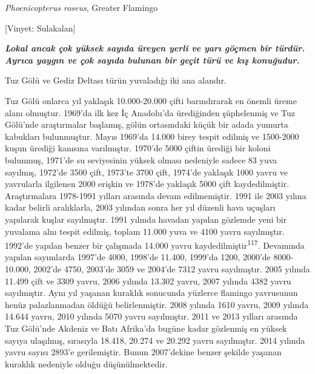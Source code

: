 \documentclass[
  letterpaper,
  DIV=11,
  numbers=noendperiod]{scrreprt}
\begin{document}
\emph{Phoenicopterus roseus}, Greater Flamingo

{[}Vinyet: Sulakalan{]}

\textbf{\emph{Lokal ancak çok yüksek sayıda üreyen yerli ve yarı göçmen
bir türdür. Ayrıca yaygın ve çok sayıda bulunan bir geçit türü ve kış
konuğudur.}}

Tuz Gölü ve Gediz Deltası türün yuvaladığı iki ana alandır.

Tuz Gölü onlarca yıl yaklaşık 10.000-20.000 çifti barındırarak en önemli
üreme alanı olmuştur. 1969'da ilk kez İç Anadolu'da ürediğinden
şüphelenmiş ve Tuz Gölü'nde araştırmalar başlamış, gölün ortasındaki
küçük bir adada yumurta kabukları bulunmuştur. Mayıs 1969'da 14.000
birey tespit edilmiş ve 1500-2000 kuşun ürediği kanısına varılmıştır.
1970'de 5000 çiftin ürediği bir koloni bulunmuş, 1971'de su seviyesinin
yüksek olması nedeniyle sadece 83 yuva sayılmış, 1972'de 3500 çift,
1973'te 3700 çift, 1974'de yaklaşık 1000 yavru ve yavrularla ilgilenen
2000 erişkin ve 1978'de yaklaşık 5000 çift kaydedilmiştir. Araştırmalara
1978-1991 yılları arasında devam edilmemiştir. 1991 ile 2003 yılına
kadar belirli aralıklarla, 2003 yılından sonra her yıl düzenli hava
uçuşları yapılarak kuşlar sayılmıştır. 1991 yılında havadan yapılan
gözlemde yeni bir yuvalama alnı tespit edilmiş, toplam 11.000 yuva ve
4100 yavru sayılmıştır. 1992'de yapılan benzer bir çalışmada 14.000
yavru kaydedilmiştir\textsuperscript{117}. Devamında yapılan sayımlarda
1997'de 4000, 1998'de 11.400, 1999'da 1200, 2000'de 8000-10.000, 2002'de
4750, 2003'de 3059 ve 2004'de 7312 yavru sayılmıştır. 2005 yılında
11.499 çift ve 3309 yavru, 2006 yılında 13.302 yavru, 2007 yılında 4382
yavru sayılmıştır. Aynı yıl yaşanan kuraklık sonucunda yüzlerce flamingo
yavrusunun henüz palazlanmadan öldüğü belirlenmiştir. 2008 yılında 1610
yavru, 2009 yılında 14.644 yavru, 2010 yılında 5070 yavru sayılmıştır.
2011 ve 2013 yılları arasında Tuz Gölü'nde Akdeniz ve Batı Afrika'da
bugüne kadar gözlenmiş en yüksek sayıya ulaşılmış, sırasıyla 18.418,
20.274 ve 20.292 yavru sayılmıştır. 2014 yılında yavru sayısı 2893'e
gerilemiştir. Bunun 2007'dekine benzer şekilde yaşanan kuraklık
nedeniyle olduğu düşünülmektedir.
\end{document}
